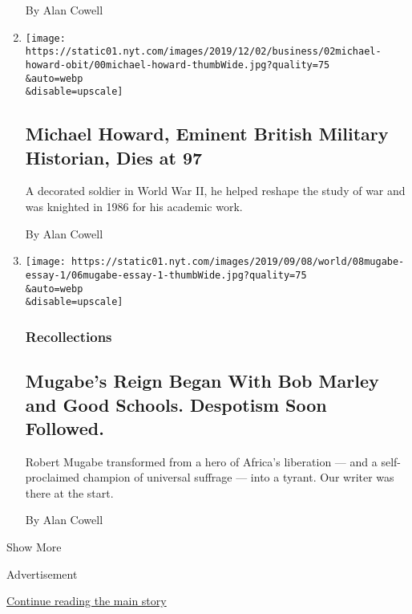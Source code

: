 \begin{enumerate}
  By Alan Cowell
\item
  \href{/2019/12/01/obituaries/michael-howard-dead.html}{}

  \texttt{[image: https://static01.nyt.com/images/2019/12/02/business/02michael-howard-obit/00michael-howard-thumbWide.jpg?quality=75\\\&auto=webp\\\&disable=upscale]}

  \hypertarget{michael-howard-eminent-british-military-historian-dies-at-97}{%
  \subsection{Michael Howard, Eminent British Military Historian, Dies
  at
  97}\label{michael-howard-eminent-british-military-historian-dies-at-97}}

  A decorated soldier in World War II, he helped reshape the study of
  war and was knighted in 1986 for his academic work.

  By Alan Cowell
\item
  \href{/2019/09/06/world/africa/robert-mugabe-zimbabwe.html}{}

  \texttt{[image: https://static01.nyt.com/images/2019/09/08/world/08mugabe-essay-1/06mugabe-essay-1-thumbWide.jpg?quality=75\\\&auto=webp\\\&disable=upscale]}

  \hypertarget{recollections}{%
  \subsubsection{Recollections}\label{recollections}}

  \hypertarget{mugabes-reign-began-with-bob-marley-and-good-schools-despotism-soon-followed}{%
  \subsection{Mugabe's Reign Began With Bob Marley and Good Schools.
  Despotism Soon
  Followed.}\label{mugabes-reign-began-with-bob-marley-and-good-schools-despotism-soon-followed}}

  Robert Mugabe transformed from a hero of Africa's liberation --- and a
  self-proclaimed champion of universal suffrage --- into a tyrant. Our
  writer was there at the start.

  By Alan Cowell
\end{enumerate}

Show More

Advertisement

\protect\hyperlink{after-mid2}{Continue reading the main story}

